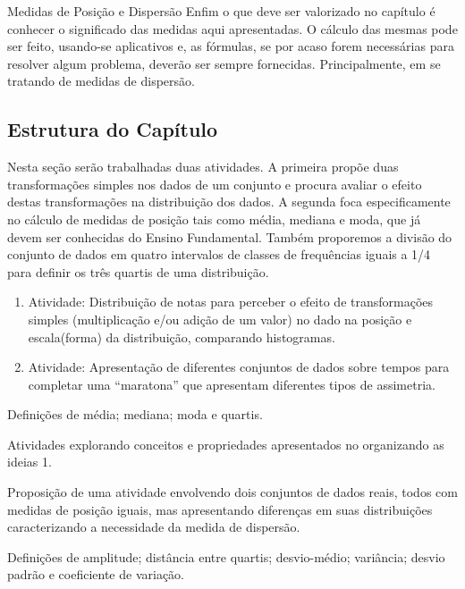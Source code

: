 \begin{apresentacao}{Medidas de Posição e Dispersão}
Enfim o que deve ser valorizado no capítulo é conhecer o significado das medidas aqui apresentadas. O cálculo das mesmas pode ser feito, usando-se aplicativos e, as fórmulas, se por acaso forem necessárias para resolver algum problema, deverão ser sempre fornecidas. Principalmente, em se tratando de medidas de dispersão.

\columnbreak
\raggedcolumns
\subsection{Estrutura do Capítulo}


Nesta seção serão trabalhadas duas atividades. A primeira propõe duas transformações simples nos dados de um conjunto e procura avaliar o efeito destas transformações na distribuição dos dados. A segunda foca especificamente no cálculo de medidas de posição tais como média, mediana e moda, que já devem ser conhecidas do Ensino Fundamental. Também proporemos a divisão do conjunto de dados em quatro intervalos de classes de frequências iguais a 1/4 para definir os três quartis de uma distribuição.

\begin{enumerate}
\item Atividade: Distribuição de notas para perceber o efeito de transformações simples (multiplicação e/ou adição de um valor) no dado na posição e escala(forma) da distribuição, comparando histogramas.
\item Atividade: Apresentação de diferentes conjuntos de dados sobre tempos para completar uma “maratona”{} que apresentam diferentes tipos de assimetria.
\end{enumerate}


Definições de média; mediana; moda e quartis.

Atividades explorando conceitos e propriedades apresentados no organizando as ideias 1.

Proposição de uma atividade envolvendo dois conjuntos de dados reais, todos com medidas de posição iguais, mas apresentando diferenças em suas distribuições caracterizando a necessidade da medida de dispersão.

Definições de amplitude; distância entre quartis; desvio-médio; variância; desvio padrão e coeficiente de variação.


\end{apresentacao}
